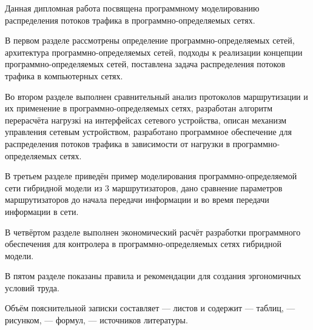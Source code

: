 
Данная дипломная работа посвящена программному моделированию
распределения потоков трафика в программно-определяемых сетях.

В первом разделе рассмотрены определение программно-определяемых
сетей, архитектура программно-определяемых сетей, подходы к реализации
концепции программно-определяемых сетей, поставлена задача распределения
потоков трафика в компьютерных сетях.

Во втором разделе выполнен сравнительный анализ протоколов маршрутизации
и их применение в программно-определяемых сетях, разработан алгоритм
перерасчёта нагрузкі на интерфейсах сетевого устройства, описан механизм
управления сетевым устройством, разработано программное обеспечение для
распределения потоков трафика в зависимости от нагрузки в программно-определяемых сетях.

В третьем разделе приведён пример моделирования программно-определяемой сети гибридной модели из 3 маршрутизаторов, дано сравнение параметров
маршрутизаторов до начала передачи информации и во время передачи информации в сети.

В четвёртом разделе выполнен экономический расчёт разработки программного
обеспечения для контролера в программно-определяемых сетях гибридной модели.

В пятом разделе показаны правила и рекомендации для создания эргономичных
условий труда.

Объём пояснительной записки составляет --- листов и содержит
--- таблиц, --- рисунком, --- формул, --- источников литературы.
